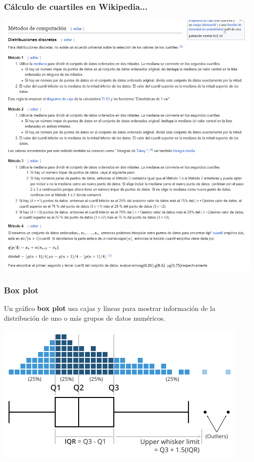 \documentclass[aspectratio=169,12pt]{beamer}
\begin{document}

\begin{frame}
\frametitle{Cálculo de cuartiles en Wikipedia...}

\begin{center}
\includegraphics[scale=.3]{clase4-cuartiles.png}
\end{center}

\end{frame}


\begin{frame}
\frametitle{Box plot}

Un gráfico \textbf{box plot} usa cajas y líneas para mostrar información de la distribución de uno o más grupos de datos numéricos.

\begin{center}
\includegraphics[scale=.5]{clase4-box-plot-construction.png}
\end{center}

\end{frame}
\end{document}
